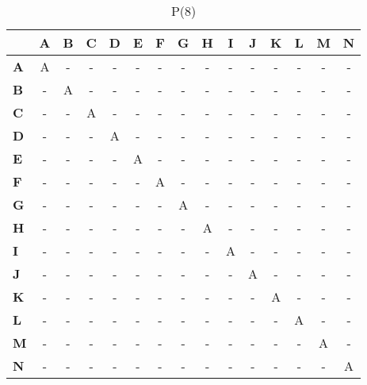 \documentclass{article}
\begin{document}
\begin{table}[H]\centering
\caption{P(8)}
\begin{tabular}{l c c c c c c c c c c c c c c}
\toprule
 & \textbf{A} & \textbf{B} & \textbf{C} & \textbf{D} & \textbf{E} & \textbf{F} & \textbf{G} & \textbf{H} & \textbf{I} & \textbf{J} & \textbf{K} & \textbf{L} & \textbf{M} & \textbf{N}\\\midrule
\textbf{A} & A & - & - & - & - & - & - & - & - & - & - & - & - & - \\
\textbf{B} & - & A & - & - & - & - & - & - & - & - & - & - & - & - \\
\textbf{C} & - & - & A & - & - & - & - & - & - & - & - & - & - & - \\
\textbf{D} & - & - & - & A & - & - & - & - & - & - & - & - & - & - \\
\textbf{E} & - & - & - & - & A & - & - & - & - & - & - & - & - & - \\
\textbf{F} & - & - & - & - & - & A & - & - & - & - & - & - & - & - \\
\textbf{G} & - & - & - & - & - & - & A & - & - & - & - & - & - & - \\
\textbf{H} & - & - & - & - & - & - & - & A & - & - & - & - & - & - \\
\textbf{I} & - & - & - & - & - & - & - & - & A & - & - & - & - & - \\
\textbf{J} & - & - & - & - & - & - & - & - & - & A & - & - & - & - \\
\textbf{K} & - & - & - & - & - & - & - & - & - & - & A & - & - & - \\
\textbf{L} & - & - & - & - & - & - & - & - & - & - & - & A & - & - \\
\textbf{M} & - & - & - & - & - & - & - & - & - & - & - & - & A & - \\
\textbf{N} & - & - & - & - & - & - & - & - & - & - & - & - & - & A \\
\bottomrule
\end{tabular}
\end{table}
\end{document}
